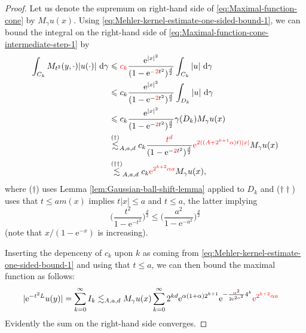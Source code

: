 \documentclass{amsart}
\theoremstyle{remark}
\newcommand{\D}{\,\textup{d}}
\renewcommand{\leq}{\leqslant}
\renewcommand{\leq}{\leqslant}
\newcommand{\e}{\mathrm{e}} %
\renewcommand{\leq}{\leqslant}%
\newcommand{\red}{\color{red}}
\begin{document}
\begin{proof}
 Let us denote the supremum on right-hand side of \eqref{eq:Maximal-function-cone} by $M_\gamma u (x)$.
 Using \eqref{eq:Mehler-kernel-estimate-one-sided-bound-1}, we can bound the integral on the right-hand side of
  \eqref{eq:Maximal-function-cone-intermediate-step-1} by 
  \begin{align*}
    \int_{C_k}  M_{t^2}(y, \cdot) |u(\cdot)| \,\D\gamma & \leq
    {\red c_k} \frac{\e^{|x|^2}}{(1 - \e^{-{\red 2}t^2})^{\frac{d}2}}   \int_{C_k}
    |u| \,\D\gamma\\ 
    &\leq c_k \frac {\e^{|x|^2}} {(1 -
      \e^{-{\red 2}t^2})^{\frac{d}2}} \int_{D_k} |u| \,\D\gamma\\ 
    &\leq c_k  \frac {\e^{|x|^2}}{(1 - \e^{-{\red 2}t^2})^{\frac{d}2}}  \gamma(D_k) M_\gamma u(x)\\
    &\overset{(\dagger)}{\lesssim}_{A,a,d} c_k 
    \frac {{\red t^d}}{(1 - \e^{-{\red 2}t^2})^{\frac{d}2}} {\red   \e^{2((A +2^{k + 1}\alpha)t)|x|}   }M_\gamma u(x)\\
  &\overset{(\dagger\dagger)}{\lesssim}_{A,a,d} c_k 
    {\red  \e^{2^{k + 2}\alpha a}   }M_\gamma u(x),
  \end{align*}
  where ($\dagger$) uses 
 Lemma \ref{lem:Gaussian-ball-shift-lemma} applied to $D_k$ and 
  ($\dagger\dagger$) uses that $t \leq am(x)$ implies $t|x|\le a$ and $t\le a$, the latter implying
  \begin{equation*}
    \biggl(\frac{t^2}{1 -
      \e^{-t^2}} \biggr)^{\frac{d}2} \leq
      \biggl(\frac{a^2}{1 -
      \e^{-a^2}} \biggr)^{\frac{d}2}
  \end{equation*}
  (note that $x/(1-\e^{-x})$ is increasing).
  

  Inserting the depenceny of $c_k$ upon $k$ as coming from 
  \eqref{eq:Mehler-kernel-estimate-one-sided-bound-1} and using that $t\le a$, 
  we can then bound the maximal function as follows: 
  \begin{align*}
    |\e^{-t^2 L} u(y)| &= \sum_{k = 0}^\infty I_k
    \lesssim_{A,a,d} M_\gamma u(x) \sum_{k = 0}^\infty 2^{kd} \e^{\alpha(1+\alpha) 2^{k + 1}} 
    \e^{-\frac{\alpha^2}{2 \e^{2{\red a}^2}}  4^k}{\red \e^{ 2^{k + 2} \alpha a}}
  \end{align*}
Evidently the sum on the right-hand side converges.
 \end{proof} 
\end{document}
